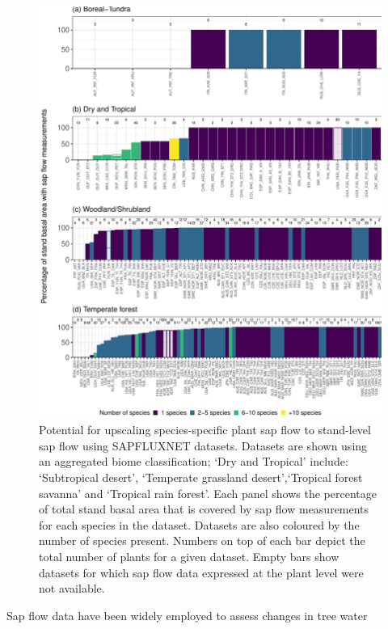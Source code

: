 \documentclass[11pt,twoside]{reedthesis}
\begin{document}
\vspace*{\fill} \newpage

\setlength{\abovecaptionskip}{0pt}
\begin{figure}[H]

{\centering \includegraphics[width=0.9\linewidth]{figure/CH3/Figure9} 

}

\caption[Potential for upscaling species-specific plant sap flow to stand-level.]{Potential for upscaling species-specific plant sap flow to stand-level sap flow using SAPFLUXNET datasets. Datasets are shown using an aggregated biome classification; ‘Dry and Tropical’ include: ‘Subtropical desert’, ‘Temperate grassland desert’,‘Tropical forest savanna’ and ‘Tropical rain forest’. Each panel shows the percentage of total stand basal area that is covered by sap flow measurements for each species in the dataset. Datasets are also coloured by the number of species present. Numbers on top of each bar depict the total number of plants for a given dataset. Empty bars show datasets for which sap flow data expressed at the plant level were not available.}\label{fig:Ch2plot9}
\end{figure}
Sap flow data have been widely employed to assess changes in tree water
\end{document}
